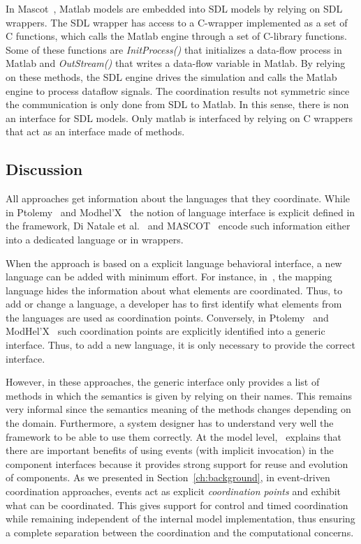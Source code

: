 In Mascot~\cite{mascotbib}, Matlab models are embedded into SDL models by relying on SDL wrappers. The SDL wrapper has access to a C-wrapper implemented as a set of C functions, which calls the Matlab engine through a set of C-library functions. Some of these functions are \emph{InitProcess()} that initializes a data-flow process in Matlab and \emph{OutStream()} that writes a data-flow variable in Matlab. By relying on these methods, the SDL engine drives the simulation and calls the Matlab engine to process dataflow signals. The coordination results not symmetric since the communication is only done from SDL to Matlab. In this sense, there is non an interface for SDL models. Only matlab is interfaced by relying on C wrappers that act as an interface made of methods.
\subsection{Discussion}
All approaches get information about the languages that they coordinate. While in Ptolemy~\cite{ptoleframebib} and Modhel'X~\cite{modhelxbib} the notion of language interface is explicit defined in the framework, Di Natale et al.~\cite{dinatale} and MASCOT~\cite{mascotbib} encode such information either into a dedicated language or in wrappers. 

When the approach is based on a explicit language behavioral interface, a new language can be added with minimum effort. For instance, in~\cite{dinatale}, the mapping language hides the information about what elements are coordinated. Thus, to add or change a language, a developer has to first identify what elements from the languages are used as coordination points. Conversely, in Ptolemy~\cite{ptoleframebib} and ModHel'X~\cite{modhelxbib} such coordination points are explicitly identified into a generic interface. Thus, to add a new language, it is only necessary to provide the correct interface. 
			
However, in these approaches, the generic interface only provides a list of methods in which the semantics is given by relying on their names. This remains very informal since the semantics meaning of the methods changes depending on the domain. Furthermore, a system designer has to understand very well the framework to be able to use them correctly. At the model level,~\cite{garlansoftarchbib} explains that there are important benefits of using events (with implicit invocation) in the component interfaces because it provides strong support for reuse and evolution of components. As we presented in Section~\ref{ch:background}, in event-driven coordination approaches, events act as explicit \emph{coordination points} and exhibit what can be coordinated. This gives support for control and timed coordination while remaining independent of the internal model implementation, thus ensuring a complete separation between the coordination and the computational concerns.
	 	
